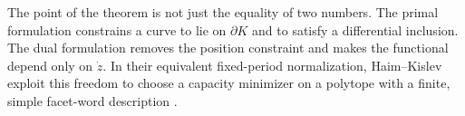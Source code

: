 The point of the theorem is not just the equality of two numbers. The primal
formulation constrains a curve to lie on \(\partial K\) and to satisfy a
differential inclusion. The dual formulation removes the position constraint
and makes the functional depend only on \(\dot{z}\). In their equivalent
fixed-period normalization, Haim--Kislev exploit this freedom to choose a
capacity minimizer on a polytope with a finite, simple facet-word description
\cite{HK2017}.
